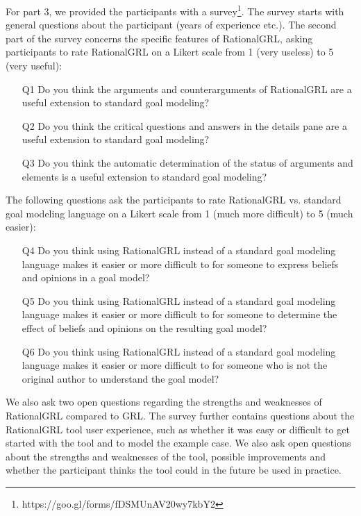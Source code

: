 For part 3, we provided the participants with a survey\footnote{https://goo.gl/forms/fDSMUnAV20wy7kbY2}. The survey starts with general questions about the participant (years of experience etc.). The second part of the survey concerns the specific features of RationalGRL, asking participants to rate RationalGRL on a Likert scale from 1 (very useless) to 5 (very useful):
\begin{itemize}
\item[Q1] Do you think the arguments and counterarguments of RationalGRL are a useful extension to standard goal modeling?
\item[Q2] Do you think the critical questions and answers in the details pane are a useful extension to standard goal modeling?
\item[Q3] Do you think the automatic determination of the status of arguments and elements is a useful extension to standard goal modeling?
\end{itemize}
The following questions ask the participants to rate RationalGRL vs. standard goal modeling language  on a Likert scale from 1 (much more difficult) to 5 (much easier):
\begin{itemize}
\item[Q4] Do you think using RationalGRL instead of a standard goal modeling language makes it easier or more difficult to for someone to express beliefs and opinions in a goal model?
\item[Q5] Do you think using RationalGRL instead of a standard goal modeling language makes it easier or more difficult to for someone to determine the effect of beliefs and opinions on the resulting goal model?
\item [Q6] Do you think using RationalGRL instead of a standard goal modeling language makes it easier or more difficult to for someone who is not the original author to understand the goal model? 
\end{itemize}
We also ask two open questions regarding the strengths and weaknesses of RationalGRL compared to GRL. The survey further contains questions about the RationalGRL tool user experience, such as whether it was easy or difficult to get started with the tool and to model the example case. We also ask open questions about the strengths and weaknesses of the tool, possible improvements and whether the participant thinks the tool could in the future be used in practice. 

